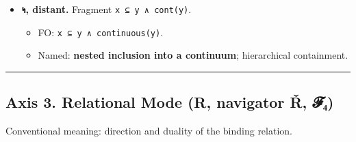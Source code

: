 \begin{itemize}
  \begin{itemize}
  \tightlist
  \item
    FO: \texttt{graph(x)\ ∧\ (∃v)\ deg(v)\ ≥\ 3}.
  \item
    Named: a \textbf{branching graph / tree with vertices of degree ≥
    3}.
  \end{itemize}
\item
  \textbf{𐑰, distant.} Fragment \texttt{x\ ⊆\ y\ ∧\ cont(y)}.

  \begin{itemize}
  \tightlist
  \item
    FO: \texttt{x\ ⊆\ y\ ∧\ continuous(y)}.
  \item
    Named: \textbf{nested inclusion into a continuum}; hierarchical
    containment.
  \end{itemize}
\end{itemize}

\begin{center}\rule{0.5\linewidth}{0.5pt}\end{center}

\hypertarget{axis-3.-relational-mode-r-navigator-ux159-ux1d4d5ux2084}{%
\subsection{Axis 3. Relational Mode (R, navigator Ř,
𝓕₄)}\label{axis-3.-relational-mode-r-navigator-ux159-ux1d4d5ux2084}}

Conventional meaning: direction and duality of the binding relation.


